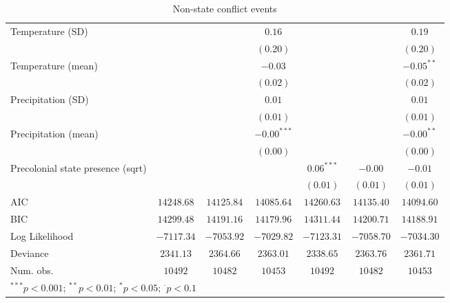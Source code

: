 \begin{sidewaystable}
\begin{center}
{\begin{tabular}{l c c c c c c}
Temperature (SD)                  &               &               & $0.16$        &               &               & $0.19$        \\
                                  &               &               & $(0.20)$      &               &               & $(0.20)$      \\
Temperature (mean)                &               &               & $-0.03$       &               &               & $-0.05^{**}$  \\
                                  &               &               & $(0.02)$      &               &               & $(0.02)$      \\
Precipitation (SD)                &               &               & $0.01$        &               &               & $0.01$        \\
                                  &               &               & $(0.01)$      &               &               & $(0.01)$      \\
Precipitation (mean)              &               &               & $-0.00^{***}$ &               &               & $-0.00^{**}$  \\
                                  &               &               & $(0.00)$      &               &               & $(0.00)$      \\
Precolonial state presence (sqrt) &               &               &               & $0.06^{***}$  & $-0.00$       & $-0.01$       \\
                                  &               &               &               & $(0.01)$      & $(0.01)$      & $(0.01)$      \\
\hline
AIC                               & $14248.68$    & $14125.84$    & $14085.64$    & $14260.63$    & $14135.40$    & $14094.60$    \\
BIC                               & $14299.48$    & $14191.16$    & $14179.96$    & $14311.44$    & $14200.71$    & $14188.91$    \\
Log Likelihood                    & $-7117.34$    & $-7053.92$    & $-7029.82$    & $-7123.31$    & $-7058.70$    & $-7034.30$    \\
Deviance                          & $2341.13$     & $2364.66$     & $2363.01$     & $2338.65$     & $2363.76$     & $2361.71$     \\
Num. obs.                         & $10492$       & $10482$       & $10453$       & $10492$       & $10482$       & $10453$       \\
\hline
\multicolumn{7}{l}{\scriptsize{$^{***}p<0.001$; $^{**}p<0.01$; $^{*}p<0.05$; $^{\cdot}p<0.1$}}
\end{tabular}
}
\caption{Non-state conflict events}
\label{non_stateFull}
\end{center}
\end{sidewaystable}
